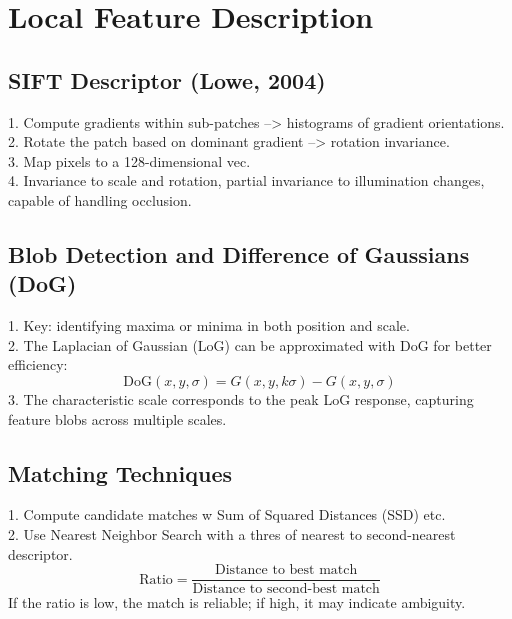 \section{Local Feature Description}


\subsection*{SIFT Descriptor (Lowe, 2004)}
1. Compute gradients within sub-patches --> histograms of gradient orientations. \\
2. Rotate the patch based on dominant gradient --> rotation invariance. \\
3. Map pixels to a 128-dimensional vec. \\
4. Invariance to scale and rotation, partial invariance to illumination changes, capable of handling occlusion.

\subsection*{Blob Detection and Difference of Gaussians (DoG)}
1. Key: identifying maxima or minima in both position and scale. \\
2. The Laplacian of Gaussian (LoG) can be approximated with DoG for better efficiency:
   \[
   \text{DoG}(x, y, \sigma) = G(x, y, k\sigma) - G(x, y, \sigma)
   \]
3. The characteristic scale corresponds to the peak LoG response, capturing feature blobs across multiple scales.

\subsection*{Matching Techniques}
1. Compute candidate matches w Sum of Squared Distances (SSD) etc. \\
2. Use Nearest Neighbor Search with a thres of nearest to second-nearest descriptor. \\
   \[
   \text{Ratio} = \frac{\text{Distance to best match}}{\text{Distance to second-best match}}
   \]
   If the ratio is low, the match is reliable; if high, it may indicate ambiguity.


